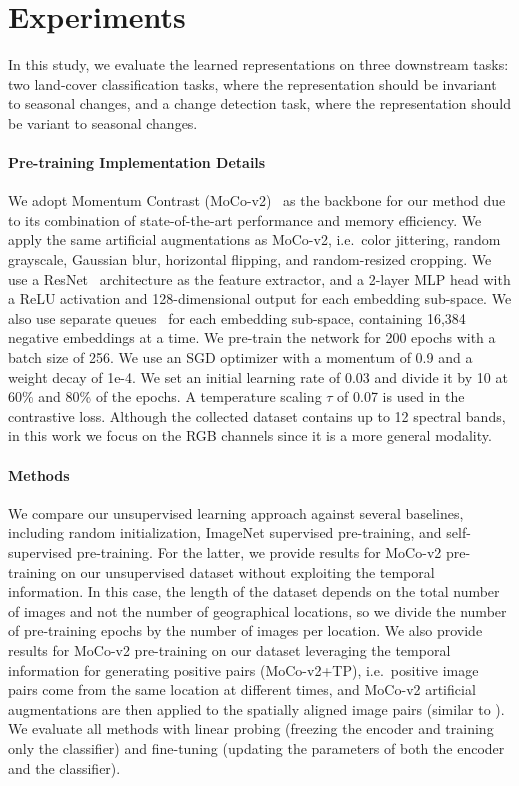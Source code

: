 \documentclass[10pt,twocolumn,letterpaper]{article}
\begin{document}
\section{Experiments}
In this study, we evaluate the learned representations on three downstream tasks: two land-cover classification tasks, where the representation should be invariant to seasonal changes, and a change detection task, where the representation should be variant to seasonal changes.

\vspace{-1em}\paragraph{Pre-training Implementation Details}
We adopt Momentum Contrast (MoCo-v2)~\cite{chen2020improved} as the backbone for our method due to its combination of state-of-the-art performance and memory efficiency. We apply the same artificial augmentations as MoCo-v2, i.e.\ color jittering, random grayscale, Gaussian blur, horizontal flipping, and random-resized cropping. We use a ResNet~\cite{he2016deep} architecture as the feature extractor, and a 2-layer MLP head with a ReLU activation and 128-dimensional output for each embedding sub-space. We also use separate queues~\cite{he2020momentum} for each embedding sub-space, containing 16,384 negative embeddings at a time. We pre-train the network for 200 epochs with a batch size of 256. We use an SGD optimizer with a momentum of 0.9 and a weight decay of 1e-4. We set an initial learning rate of 0.03 and divide it by 10 at 60\% and 80\% of the epochs. A temperature scaling $\tau$ of 0.07 is used in the contrastive loss. Although the collected dataset contains up to 12 spectral bands, in this work we focus on the RGB channels since it is a more general modality.

\vspace{-1em}\paragraph{Methods}
We compare our unsupervised learning approach against several baselines, including random initialization, ImageNet supervised pre-training, and self-supervised pre-training. For the latter, we provide results for MoCo-v2 pre-training on our unsupervised dataset without exploiting the temporal information. In this case, the length of the dataset depends on the total number of images and not the number of geographical locations, so we divide the number of pre-training epochs by the number of images per location. We also provide results for MoCo-v2 pre-training on our dataset leveraging the temporal information for generating positive pairs (MoCo-v2+TP), i.e.\ positive image pairs come from the same location at different times, and MoCo-v2 artificial augmentations are then applied to the spatially aligned image pairs (similar to \citet{ayush2020geography}). We evaluate all methods with linear probing (freezing the encoder and training only the classifier) and fine-tuning (updating the parameters of both the encoder and the classifier).
\end{document}

